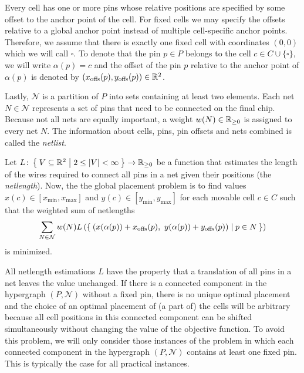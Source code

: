 Every cell has one or more pins whose relative positions are specified by some offset to the anchor point of the cell.
For fixed cells we may specify the offsets relative to a global anchor point instead of multiple cell-specific anchor points.
Therefore, we assume that there is exactly one fixed cell with coordinates \((0, 0)\) which we will call \(\square\).
To denote that the pin \(p \in P\) belongs to the cell \(c \in C \cup \{\square\}\),
we will write \(\alpha(p) = c\) and the offset of the pin \(p\) relative to the anchor point of \(\alpha(p)\)
is denoted by \((x_{\operatorname{offs}}(p), y_{\operatorname{offs}}(p)) \in \mathbb{R}^2\).

Lastly, \(\mathcal{N}\) is a partition of \(P\) into sets containing at least two elements. 
Each net \(N \in \mathcal{N}\) represents a set of pins that need to be connected on the final chip.
Because not all nets are equally important, a weight \(w(N) \in \mathbb{R}_{\geq 0}\) is assigned to every net \(N\).
The information about cells, pins, pin offsets and nets combined is called the \emph{netlist}.

Let \(L \colon \Set{V \subseteq \mathbb{R}^2 | 2 \leq \lvert V\rvert < \infty} \to \mathbb{R}_{\geq 0}\) be a function that estimates the length of the wires required to connect all pins in a net given their positions (the \emph{netlength}).
Now, the the global placement problem is to find values \(x(c) \in [x_{\min}, x_{\max}]\) and \(y(c) \in [y_{\min}, y_{\max}]\) for each movable cell \(c \in C\) such that the weighted sum of netlengths
\[ \sum_{N \in \mathcal{N}} w(N) L\left({\Set{\left({x(\alpha(p)) + x_{\operatorname{offs}}(p), \ y(\alpha(p)) + y_{\operatorname{offs}}(p)}\right) \mid p \in N}}\right) \]
is minimized. 

All netlength estimations \(L\) have the property that a translation of all pins in a net leaves the value unchanged.
If there is a connected component in the hypergraph \((P, \mathcal{N})\) without a fixed pin,
there is no unique optimal placement and the choice of an optimal placement of (a part of) the cells will be arbitrary
because all cell positions in this connected component can be shifted simultaneously without changing the value of the objective function.
To avoid this problem, we will only consider those instances of the problem in which each connected component in the hypergraph \((P, \mathcal{N})\)
contains at least one fixed pin. This is typically the case for all practical instances.

